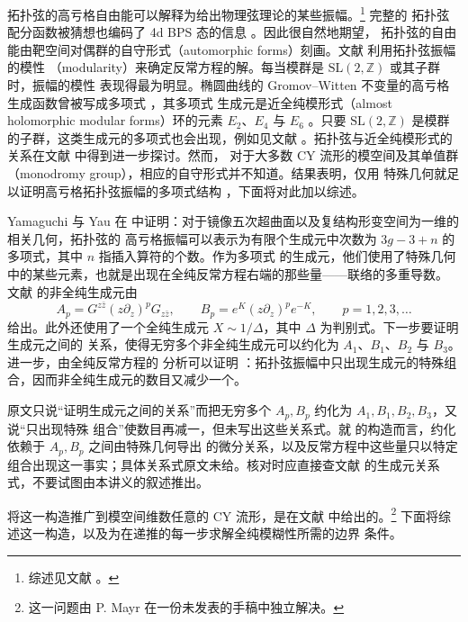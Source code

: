 拓扑弦的高亏格自由能可以解释为给出物理弦理论的某些振幅。\footnote{综述见文献 \cite{ref72}。} 完整的
拓扑弦配分函数被猜想也编码了 4d BPS 态的信息 \cite{ref73}。因此很自然地期望，%
拓扑弦的自由能由靶空间对偶群的自守形式（automorphic forms）刻画。文献 \cite{ref19} 利用拓扑弦振幅的模性
（modularity）来确定反常方程的解。每当模群是 $\mathrm{SL}(2,\mathbb{Z})$ 或其子群时，振幅的模性
表现得最为明显。椭圆曲线的 Gromov--Witten 不变量的高亏格生成函数曾被写成多项式 \cite{ref74,ref75}，其多项式
生成元是近全纯模形式（almost holomorphic modular forms）环的元素 $E_2$、$E_4$ 与 $E_6$ \cite{ref76}。只要
$\mathrm{SL}(2,\mathbb{Z})$ 是模群的子群，这类生成元的多项式也会出现，例如见文献
\cite{ref77,ref78,ref79,ref80,ref28,ref81}。拓扑弦与近全纯模形式的关系在文献 \cite{ref23,ref82,ref24} 中得到进一步探讨。然而，
对于大多数 CY 流形的模空间及其单值群（monodromy group），相应的自守形式并不知道。结果表明，仅用
特殊几何就足以证明高亏格拓扑弦振幅的多项式结构 \cite{ref21,ref22}，下面将对此加以综述。

Yamaguchi 与 Yau 在 \cite{ref21} 中证明：对于镜像五次超曲面以及复结构形变空间为一维的相关几何，拓扑弦的
高亏格振幅可以表示为有限个生成元中次数为 $3g-3+n$ 的多项式，其中 $n$ 指插入算符的个数。作为多项式
的生成元，他们使用了特殊几何中的某些元素，也就是出现在全纯反常方程右端的那些量——联络的多重导数。
文献 \cite{ref21} 的非全纯生成元由
\[
  A_p = G^{z\bar z}(z\partial_z)^p G_{z\bar z},
  \qquad
  B_p = e^{K}(z\partial_z)^p e^{-K},
  \qquad p=1,2,3,\ldots
\]
给出。此外还使用了一个全纯生成元 $X\sim 1/\Delta$，其中 $\Delta$ 为判别式。下一步要证明生成元之间的
关系，使得无穷多个非全纯生成元可以约化为 $A_1$、$B_1$、$B_2$ 与 $B_3$。进一步，由全纯反常方程的
分析可以证明 \cite{ref21}：拓扑弦振幅中只出现生成元的特殊组合，因而非全纯生成元的数目又减少一个。

\begin{yizhu}[含糊点]
原文只说“证明生成元之间的关系”而把无穷多个 $A_p,B_p$ 约化为 $A_1,B_1,B_2,B_3$，又说“只出现特殊
组合”使数目再减一，但未写出这些关系式。就 \cite{ref21} 的构造而言，约化依赖于 $A_p,B_p$ 之间由特殊几何导出
的微分关系，以及反常方程中这些量只以特定组合出现这一事实；具体关系式原文未给。核对时应直接查文献
\cite{ref21} 的生成元关系式，不要试图由本讲义的叙述推出。
\end{yizhu}

将这一构造推广到模空间维数任意的 CY 流形，是在文献 \cite{ref22} 中给出的。\footnote{这一问题由 P. Mayr
在一份未发表的手稿中独立解决。} 下面将综述这一构造，以及为在递推的每一步求解全纯模糊性所需的边界
条件。

